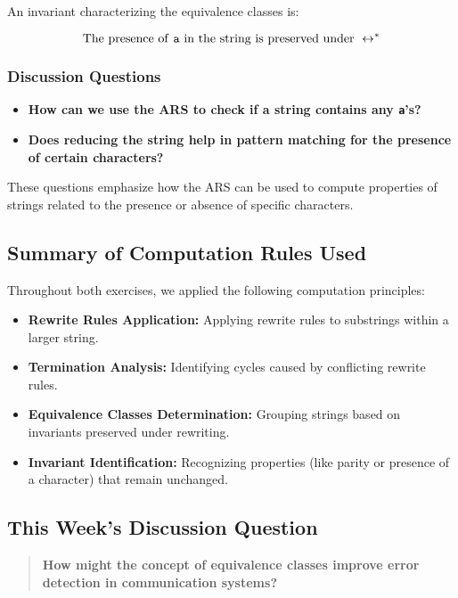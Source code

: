 \documentclass{article}
\begin{document}
An invariant characterizing the equivalence classes is:

\begin{equation*}
    \text{The presence of \texttt{a} in the string is preserved under }\leftrightarrow^*
\end{equation*}

\subsubsection*{Discussion Questions}

\begin{itemize}
    \item \textbf{How can we use the ARS to check if a string contains any \texttt{a}'s?}
    \item \textbf{Does reducing the string help in pattern matching for the presence of certain characters?}
\end{itemize}

These questions emphasize how the ARS can be used to compute properties of strings related to the presence or absence of specific characters.

\subsection*{Summary of Computation Rules Used}

Throughout both exercises, we applied the following computation principles:

\begin{itemize}
    \item \textbf{Rewrite Rules Application:} Applying rewrite rules to substrings within a larger string.
    \item \textbf{Termination Analysis:} Identifying cycles caused by conflicting rewrite rules.
    \item \textbf{Equivalence Classes Determination:} Grouping strings based on invariants preserved under rewriting.
    \item \textbf{Invariant Identification:} Recognizing properties (like parity or presence of a character) that remain unchanged.
\end{itemize}

\subsection*{This Week's Discussion Question}

\begin{quote}
\small
\textbf{How might the concept of equivalence classes improve error detection in communication systems?}
\end{quote}
\end{document}
